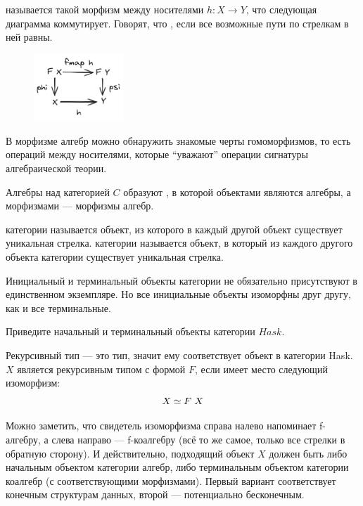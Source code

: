  называется такой морфизм между носителями $h : X \to Y$, что следующая диаграмма коммутирует.
Говорят, что , если все возможные пути по стрелкам в ней равны.
\begin{figure}[h!]
    \centering
    \includegraphics[width=0.3\textwidth]{figs/alg-homomorphism}
\end{figure}

В морфизме алгебр можно обнаружить знакомые черты гомоморфизмов, то есть операций между носителями, которые ``уважают'' операции сигнатуры алгебраической теории.

Алгебры над категорией $C$ образуют , в которой объектами являются алгебры, а морфизмами --- морфизмы алгебр.

 категории называется объект, из которого в каждый другой объект существует уникальная стрелка.
 категории называется объект, в который из каждого другого объекта категории существует уникальная стрелка.

Инициальный и терминальный объекты категории не обязательно присутствуют в единственном экземпляре.
Но все инициальные объекты изоморфны друг другу, как и все терминальные.

\begin{task}
    Приведите начальный и терминальный объекты категории $Hask$.
\end{task}

Рекурсивный тип --- это тип, значит ему соответствует объект в категории Hask.
$X$ является рекурсивным типом с формой $F$, если имеет место следующий изоморфизм:
\[X \simeq F~ X\]

Можно заметить, что свидетель изоморфизма справа налево напоминает f-алгебру, а слева направо --- f-коалгебру (всё то же самое, только все стрелки в обратную сторону).
И действительно, подходящий объект $X$ должен быть либо начальным объектом категории алгебр, либо терминальным объектом категории коалгебр (с соответствующими морфизмами).
Первый вариант соответствует конечным структурам данных, второй --- потенциально бесконечным.

